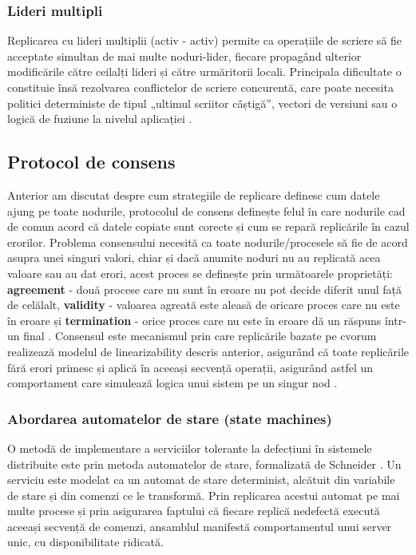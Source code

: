 \subsubsection{Lideri multipli}

Replicarea cu lideri multiplii (activ - activ) permite ca operațiile de scriere să fie acceptate simultan de mai multe noduri-lider, fiecare propagând ulterior modificările către ceilalți lideri și către urmăritorii locali. Principala dificultate o constituie însă rezolvarea conflictelor de scriere concurentă, care poate necesita politici deterministe de tipul „ultimul scriitor câștigă”, vectori de versiuni sau o logică de fuziune la nivelul aplicației \cite{gray1996}.

\subsection{Protocol de consens}

Anterior am discutat despre cum strategiile de replicare definesc cum datele ajung pe toate nodurile, protocolul de consens definește felul în care nodurile cad de comun acord că datele copiate sunt corecte și cum se repară replicările în cazul erorilor. Problema consensului necesită ca toate nodurile/procesele să fie  de acord asupra unei singuri valori, chiar și dacă anumite noduri nu au replicată acea valoare sau au dat erori, acest proces se definește prin următoarele proprietăți: \textbf{agreement} - două procese care nu sunt în eroare nu pot decide diferit unul față de celălalt, \textbf{validity} - valoarea agreată este aleasă de oricare proces care nu este în eroare și \textbf{termination} - orice proces care nu este în eroare dă un răspuns într-un final \cite{fischer1985}. Consensul este mecanismul prin care replicările bazate pe cvorum realizează modelul de linearizability descris anterior, asigurând că toate replicările fără erori primesc și aplică în aceeași secvență operații, asigurând astfel un comportament care simulează logica unui sistem pe un singur nod \cite{herlihy1990}.

\subsubsection{Abordarea automatelor de stare (state machines)}

O metodă de implementare a serviciilor tolerante la defecțiuni în sistemele distribuite este prin metoda automatelor de stare, formalizată de Schneider \cite{schneider1990}. Un serviciu este modelat ca un automat de stare determinist, alcătuit din variabile de stare și din comenzi ce le transformă. Prin replicarea acestui automat pe mai multe procese și prin asigurarea faptului că fiecare replică nedefectă execută aceeași secvență de comenzi, ansamblul manifestă comportamentul unui server unic, cu disponibilitate ridicată.

